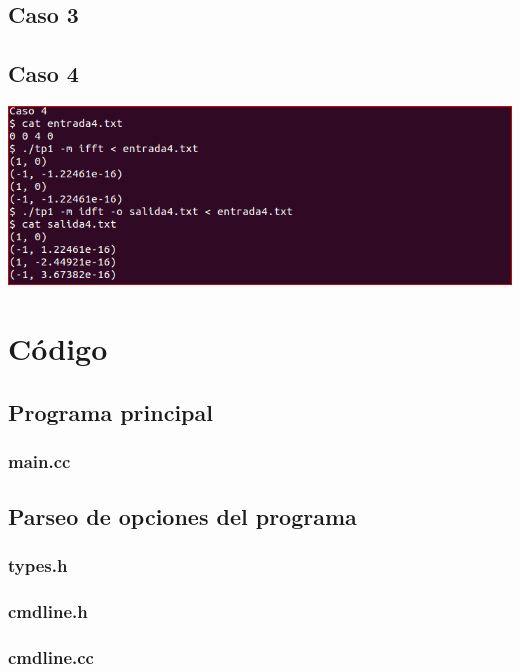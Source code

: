 \documentclass{article}
\begin{document}
  \subsection{Caso 3}
    
  \subsection{Caso 4}
    \begin{center}
      \includegraphics[width=0.8\paperwidth]{Imagenes/caso_4}
    \end{center}

\section{Código}
  \subsection{Programa principal}
    \subsubsection{main.cc}
      
  \subsection{Parseo de opciones del programa}
    \subsubsection{types.h}
      
    \subsubsection{cmdline.h}
      
    \subsubsection{cmdline.cc}
      
\end{document}
